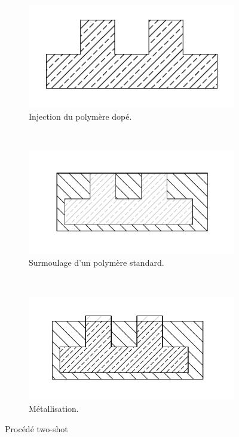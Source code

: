 \begin{figure}[h]
        \centering
        \begin{subfigure}[t]{0.3\textwidth}
                \includegraphics[width=\textwidth]{../images/two-shot-example/inner}
                \caption{Injection du polymère dopé.}
                \label{fig:first-shot}
        \end{subfigure}%
        ~ 
        \begin{subfigure}[t]{0.3\textwidth}
                \includegraphics[width=\textwidth]{../images/two-shot-example/second_shot}
                \caption{Surmoulage d'un polymère standard.}
                \label{fig:second-shot}
        \end{subfigure}
        ~
        \begin{subfigure}[t]{0.3\textwidth}
                \includegraphics[width=\textwidth]{../images/two-shot-example/after_metal}
                \caption{Métallisation.}
                \label{fig:two-shot-metal}
        \end{subfigure}
        \caption{Procédé two-shot}\label{fig:two-shot-process}
\end{figure}


